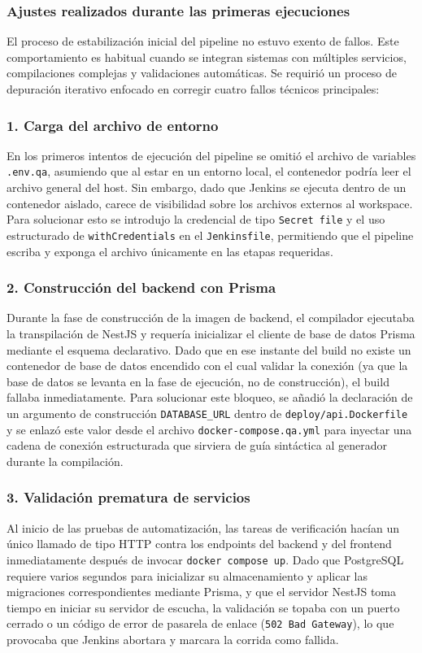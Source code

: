 \documentclass{article}
\begin{document}
\subsubsection{Ajustes realizados durante las primeras ejecuciones}
El proceso de estabilización inicial del pipeline no estuvo exento de fallos. Este comportamiento es habitual cuando se integran sistemas con múltiples servicios, compilaciones complejas y validaciones automáticas. Se requirió un proceso de depuración iterativo enfocado en corregir cuatro fallos técnicos principales:

\subsubsection*{1. Carga del archivo de entorno}
En los primeros intentos de ejecución del pipeline se omitió el archivo de variables \texttt{.env.qa}, asumiendo que al estar en un entorno local, el contenedor podría leer el archivo general del host. Sin embargo, dado que Jenkins se ejecuta dentro de un contenedor aislado, carece de visibilidad sobre los archivos externos al workspace. Para solucionar esto se introdujo la credencial de tipo \texttt{Secret file} y el uso estructurado de \texttt{withCredentials} en el \texttt{Jenkinsfile}, permitiendo que el pipeline escriba y exponga el archivo únicamente en las etapas requeridas.

\subsubsection*{2. Construcción del backend con Prisma}
Durante la fase de construcción de la imagen de backend, el compilador ejecutaba la transpilación de NestJS y requería inicializar el cliente de base de datos Prisma mediante el esquema declarativo. Dado que en ese instante del build no existe un contenedor de base de datos encendido con el cual validar la conexión (ya que la base de datos se levanta en la fase de ejecución, no de construcción), el build fallaba inmediatamente. Para solucionar este bloqueo, se añadió la declaración de un argumento de construcción \texttt{DATABASE\_URL} dentro de \texttt{deploy/api.Dockerfile} y se enlazó este valor desde el archivo \texttt{docker-compose.qa.yml} para inyectar una cadena de conexión estructurada que sirviera de guía sintáctica al generador durante la compilación.

\subsubsection*{3. Validación prematura de servicios}
Al inicio de las pruebas de automatización, las tareas de verificación hacían un único llamado de tipo HTTP contra los endpoints del backend y del frontend inmediatamente después de invocar \texttt{docker compose up}. Dado que PostgreSQL requiere varios segundos para inicializar su almacenamiento y aplicar las migraciones correspondientes mediante Prisma, y que el servidor NestJS toma tiempo en iniciar su servidor de escucha, la validación se topaba con un puerto cerrado o un código de error de pasarela de enlace (\texttt{502 Bad Gateway}), lo que provocaba que Jenkins abortara y marcara la corrida como fallida.
\end{document}
